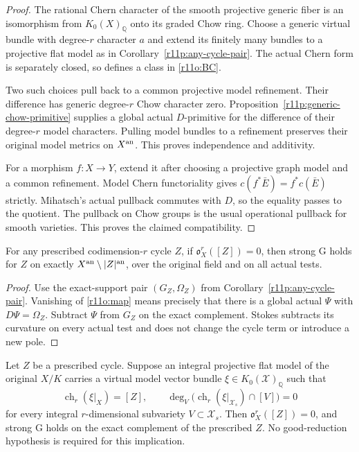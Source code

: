 \begin{proof}
The rational Chern character of the smooth projective generic fiber
is an isomorphism from $K_0(X)_{\mathbb Q}$ onto its graded Chow ring.
Choose a generic virtual bundle with degree-$r$ character $a$ and
extend its finitely many bundles to a projective flat model as in
Corollary~\ref{r11p:any-cycle-pair}.  The actual Chern form is
separately closed, so defines a class in \eqref{r11o:BC}.

Two such choices pull back to a common projective model refinement.
Their difference has generic degree-$r$ Chow character zero.
Proposition~\ref{r11p:generic-chow-primitive} supplies a global actual
$D$-primitive for the difference of their degree-$r$ model characters.
Pulling model bundles to a refinement preserves their original model
metrics on $X^{\rm an}$.  This proves independence and additivity.

For a morphism $f:X\to Y$, extend it after choosing a projective
graph model and a common refinement.  Model Chern functoriality gives
$c(f^*\bar E)=f^*c(\bar E)$ strictly.  Mihatsch's actual pullback
commutes with $D$, so the equality passes to the quotient.  The
pullback on Chow groups is the usual operational pullback for smooth
varieties.  This proves the claimed compatibility.
\end{proof}

\begin{corollary}
\label{r11o:sufficient}
For any prescribed codimension-$r$ cycle $Z$, if
$\mathfrak o_X^r([Z])=0$, then strong G holds for $Z$ on exactly
$X^{\rm an}\setminus|Z|^{\rm an}$, over the original field and on
all actual tests.
\end{corollary}

\begin{proof}
Use the exact-support pair $(G_Z,\Omega_Z)$ from
Corollary~\ref{r11p:any-cycle-pair}.  Vanishing of
\eqref{r11o:map} means precisely that there is a global actual
$\Psi$ with $D\Psi=\Omega_Z$.  Subtract $\Psi$ from $G_Z$ on the
exact complement.  Stokes subtracts its curvature on every actual
test and does not change the cycle term or introduce a new pole.
\end{proof}

\begin{corollary}
\label{r11o:numerical-model-lift}
Let $Z$ be a prescribed cycle.  Suppose an integral projective flat
model of the original $X/K$ carries a virtual model vector bundle
$\xi\in K_0(\mathcal X)_{\mathbb Q}$ such that
\[
 \operatorname{ch}_r(\xi|_X)=[Z],\qquad
 \deg_V\bigl(\operatorname{ch}_r(\xi|_{\mathcal X_s})\cap[V]\bigr)=0
\tag{OC4}\label{r11o:numerical-lift}
\]
for every integral $r$-dimensional subvariety
$V\subset\mathcal X_s$.  Then $\mathfrak o_X^r([Z])=0$, and
strong G holds on the exact complement of the prescribed $Z$.
No good-reduction hypothesis is required for this implication.
\end{corollary}

